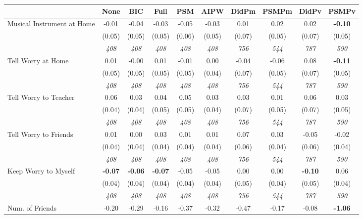 \begin{tabular}{l c c c c c c c c c}
\toprule
 & None & BIC & Full & PSM & AIPW & DidPm & PSMPm & DidPv & PSMPv \\
\midrule
Musical Instrument at Home & -0.01 & -0.04 & -0.03 & -0.05 & -0.03 & 0.01 & 0.02 & 0.02 & \textbf{-0.10} \\
& (0.05) & (0.05) & (0.05) & (0.06) & (0.05) & (0.07) & (0.05) & (0.07) & (0.05) \\
& \textit{ 408 } & \textit{ 408 } & \textit{ 408 } & \textit{ 408 } & \textit{ 408 } & \textit{ 756 } & \textit{ 544 } & \textit{ 787 } & \textit{ 590 } \\
Tell Worry at Home & 0.01 & -0.00 & 0.01 & -0.01 & 0.00 & -0.04 & -0.06 & 0.08 & \textbf{-0.11} \\
& (0.05) & (0.05) & (0.05) & (0.05) & (0.04) & (0.07) & (0.05) & (0.07) & (0.05) \\
& \textit{ 408 } & \textit{ 408 } & \textit{ 408 } & \textit{ 408 } & \textit{ 408 } & \textit{ 756 } & \textit{ 544 } & \textit{ 787 } & \textit{ 590 } \\
Tell Worry to Teacher & 0.06 & 0.03 & 0.04 & 0.05 & 0.03 & 0.03 & 0.01 & 0.06 & 0.03 \\
& (0.04) & (0.04) & (0.05) & (0.05) & (0.04) & (0.07) & (0.05) & (0.07) & (0.05) \\
& \textit{ 408 } & \textit{ 408 } & \textit{ 408 } & \textit{ 408 } & \textit{ 408 } & \textit{ 756 } & \textit{ 544 } & \textit{ 787 } & \textit{ 590 } \\
Tell Worry to Friends & 0.01 & 0.00 & 0.03 & 0.01 & 0.01 & 0.07 & 0.03 & -0.05 & -0.02 \\
& (0.04) & (0.04) & (0.04) & (0.04) & (0.04) & (0.06) & (0.04) & (0.06) & (0.04) \\
& \textit{ 408 } & \textit{ 408 } & \textit{ 408 } & \textit{ 408 } & \textit{ 408 } & \textit{ 756 } & \textit{ 544 } & \textit{ 787 } & \textit{ 590 } \\
Keep Worry to Myself & \textbf{ -0.07 } & \textbf{ -0.06 } & \textbf{ -0.07 } & -0.05 & -0.05 & 0.00 & 0.00 & \textbf{ -0.10 } & 0.06 \\
& (0.04) & (0.04) & (0.04) & (0.04) & (0.04) & (0.05) & (0.04) & (0.05) & (0.04) \\
& \textit{ 408 } & \textit{ 408 } & \textit{ 408 } & \textit{ 408 } & \textit{ 408 } & \textit{ 756 } & \textit{ 544 } & \textit{ 787 } & \textit{ 590 } \\
Num. of Friends & -0.20 & -0.29 & -0.16 & -0.37 & -0.32 & -0.47 & -0.17 & -0.08 & \textbf{-1.06} \\

\end{tabular}
